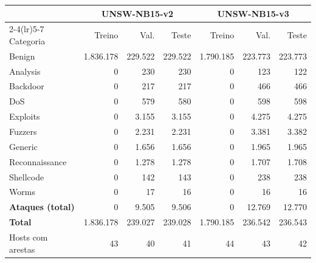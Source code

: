 \begin{tabular}{l rrr rrr}
\toprule
& \multicolumn{3}{c}{UNSW-NB15-v2} & \multicolumn{3}{c}{UNSW-NB15-v3} \\
\cmidrule(lr){2-4}\cmidrule(lr){5-7}
Categoria & Treino & Val. & Teste & Treino & Val. & Teste \\
\midrule
Benign & 1.836.178 & 229.522 & 229.522 & 1.790.185 & 223.773 & 223.773 \\
Analysis & 0 & 230 & 230 & 0 & 123 & 122 \\
Backdoor & 0 & 217 & 217 & 0 & 466 & 466 \\
DoS & 0 & 579 & 580 & 0 & 598 & 598 \\
Exploits & 0 & 3.155 & 3.155 & 0 & 4.275 & 4.275 \\
Fuzzers & 0 & 2.231 & 2.231 & 0 & 3.381 & 3.382 \\
Generic & 0 & 1.656 & 1.656 & 0 & 1.965 & 1.965 \\
Reconnaissance & 0 & 1.278 & 1.278 & 0 & 1.707 & 1.708 \\
Shellcode & 0 & 142 & 143 & 0 & 238 & 238 \\
Worms & 0 & 17 & 16 & 0 & 16 & 16 \\
\midrule
\textbf{Ataques (total)} & 0 & 9.505 & 9.506 & 0 & 12.769 & 12.770 \\
\textbf{Total} & 1.836.178 & 239.027 & 239.028 & 1.790.185 & 236.542 & 236.543 \\
\midrule
Hosts com arestas & 43 & 40 & 41 & 44 & 43 & 42 \\
\bottomrule
\end{tabular}
